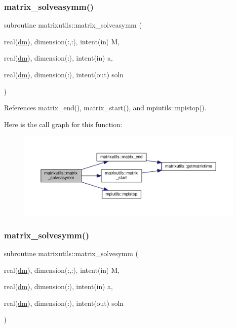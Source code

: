 \subsubsection{\texorpdfstring{matrix\+\_\+solveasymm()}{matrix\_solveasymm()}}
{\footnotesize\ttfamily subroutine matrixutils\+::matrix\+\_\+solveasymm (\begin{DoxyParamCaption}\item[{real(\mbox{\hyperlink{namespacematrixutils_a7bdc564986ea4d90f51201c75606ef3d}{dm}}), dimension(\+:,\+:), intent(in)}]{M,  }\item[{real(\mbox{\hyperlink{namespacematrixutils_a7bdc564986ea4d90f51201c75606ef3d}{dm}}), dimension(\+:), intent(in)}]{a,  }\item[{real(\mbox{\hyperlink{namespacematrixutils_a7bdc564986ea4d90f51201c75606ef3d}{dm}}), dimension(\+:), intent(out)}]{soln }\end{DoxyParamCaption})}



References matrix\+\_\+end(), matrix\+\_\+start(), and mpiutils\+::mpistop().

Here is the call graph for this function\+:
\nopagebreak
\begin{figure}[H]
\begin{center}
\leavevmode
\includegraphics[width=350pt]{namespacematrixutils_a2662807273dfd077b6501df4d09909d9_cgraph}
\end{center}
\end{figure}
\mbox{\label{namespacematrixutils_afb220a70c7ec8bcc1eb1694588300540}} 
\subsubsection{\texorpdfstring{matrix\+\_\+solvesymm()}{matrix\_solvesymm()}}
{\footnotesize\ttfamily subroutine matrixutils\+::matrix\+\_\+solvesymm (\begin{DoxyParamCaption}\item[{real(\mbox{\hyperlink{namespacematrixutils_a7bdc564986ea4d90f51201c75606ef3d}{dm}}), dimension(\+:,\+:), intent(in)}]{M,  }\item[{real(\mbox{\hyperlink{namespacematrixutils_a7bdc564986ea4d90f51201c75606ef3d}{dm}}), dimension(\+:), intent(in)}]{a,  }\item[{real(\mbox{\hyperlink{namespacematrixutils_a7bdc564986ea4d90f51201c75606ef3d}{dm}}), dimension(\+:), intent(out)}]{soln }\end{DoxyParamCaption})}



